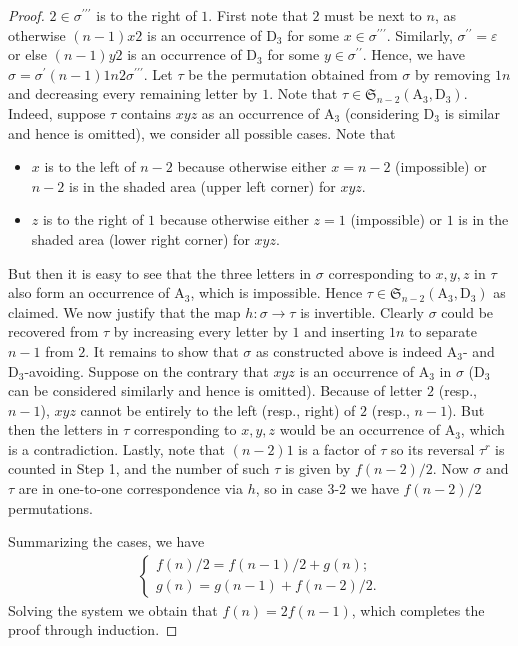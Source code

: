 \documentclass[12pt,reqno]{article}
\numberwithin{equation}{section}
\theoremstyle{plain}
\theoremstyle{definition}
\def\fS{\mathfrak{S}}
\def\rA{\mathrm{A}}
\def\rD{\mathrm{D}}
\begin{document}
\begin{proof}
	 $2\in\sigma^{\prime \prime \prime}$ is to the right of $1$. First note that $2$ must be next to $n$, as otherwise $(n-1)x2$ is an occurrence of $\rD_3$ for some $x\in \sigma^{\prime \prime \prime}$. Similarly, $\sigma^{\prime \prime}=\varepsilon$ or else $(n-1)y2$ is an occurrence of $\rD_3$ for some $y\in\sigma^{\prime \prime}$. Hence, we have $\sigma=\sigma^{\prime}(n-1)1n2\sigma^{\prime \prime \prime}$. Let $\tau$ be the permutation obtained from $\sigma$ by removing $1n$ and decreasing every remaining letter by $1$. Note that $\tau\in\fS_{n-2}(\rA_3, \rD_3)$. Indeed, suppose $\tau$ contains $xyz$ as an occurrence of $\rA_3$ (considering $\rD_3$ is similar and hence is omitted), we consider all possible cases. Note that
		\begin{itemize}
			\item $x$ is to the left of $n-2$ because otherwise either $x=n-2$ (impossible) or $n-2$ is in the shaded area (upper left corner) for $xyz$.
				
			\item $z$ is to the right of $1$ because otherwise either $z=1$ (impossible) or $1$ is in the shaded area (lower right corner) for $xyz$.
		\end{itemize}
	But then it is easy to see that the three letters in $\sigma$ corresponding to $x, y, z$ in $\tau$ also form an occurrence of $\rA_3$, which is impossible. Hence $\tau\in \fS_{n-2}(\rA_3, \rD_3)$ as claimed. We now justify that the map $h: \sigma\rightarrow \tau$ is invertible. Clearly $\sigma$ could be recovered from $\tau$ by increasing every letter by $1$ and inserting $1n$ to separate $n-1$ from $2$. It remains to show that $\sigma$ as constructed above is indeed $\rA_3$- and $\rD_3$-avoiding. Suppose on the contrary that $xyz$ is an occurrence of $\rA_3$ in $\sigma$ ($\rD_3$ can be considered similarly and hence is omitted). Because of letter $2$ (resp., $n-1$), $xyz$ cannot be entirely to the left (resp., right) of $2$ (resp., $n-1$). But then the letters in $\tau$ corresponding to $x, y, z$ would be an occurrence of $\rA_3$, which is a contradiction. Lastly, note that $(n-2)1$ is a factor of $\tau$ so its reversal $\tau^{r}$ is counted in Step 1, and the number of such $\tau$ is given by $f(n-2)/2$. Now $\sigma$ and $\tau$ are in one-to-one correspondence via $h$, so in case 3-2 we have $f(n-2)/2$ permutations.

	Summarizing the cases, we have
	\begin{align*}
	\begin{cases}
		f(n)/2 =f(n-1)/2+g(n);\\
		g(n) =g(n-1)+f(n-2)/2.
	\end{cases}
	\end{align*}
	Solving the system we obtain that $f(n)=2f(n-1)$, which completes the proof through induction.
\end{proof}
\end{document}
